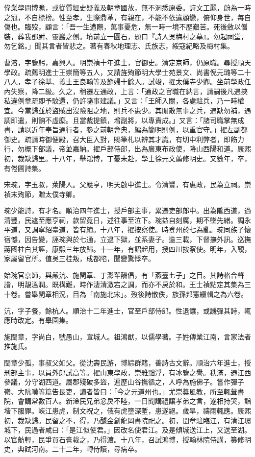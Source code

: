 \begin{pinyinscope}
偉業學問博贍，或從質經史疑義及朝章國故，無不洞悉原委。詩文工麗，蔚為一時之冠，不自標榜。性至孝，生際鼎革，有親在，不能不依違顧戀，俯仰身世，每自傷也。臨歿，顧言：「吾一生遭際，萬事憂危，無一時一境不歷艱苦。死後斂以僧裝，葬我鄧尉、靈巖之側。墳前立一圓石，題曰『詩人吳梅村之墓』。勿起祠堂，勿乞銘。」聞其言者皆悲之。著有春秋地理志、氏族志，綏寇紀略及梅村集。

曹溶，字鑒躬，嘉興人。明崇禎十年進士，官御史。清定京師，仍原職。尋授順天學政。疏薦明進士王崇簡等五人，又請旌殉節明大學士苑景文、尚書倪元璐等二十八人，孝子徐基、義士王良翰等及節婦十餘人。試竣，擢太僕寺少卿。坐前學政任內失察，降二級。久之，稍遷左通政，上言：「通政之官職在納言，請嗣後凡遇挾私違例章疏即予駮還，仍許隨事建議。」又言：「王師入關，各處駐兵，乃一時權宜。今當歸並於盜賊出沒險阻之地，則兵不患少。其閒散無事之兵，遇缺勿補，遇調即遣，則餉不虛糜。且當裁提鎮，增副將，以專責成。」又言：「諸司職掌無成書，請以近年奉旨通行者，參之前朝會典，編為簡明則例，以重官守。」擢左副都御史。疏請時御便殿，召大臣入對，賜筆札以辨其才識，有切中利弊者，即飭力行，勿概下部議，帝並嘉納。擢戶部侍郎，出為廣東布政使，降山西陽和道。康熙初，裁缺歸里。十八年，舉鴻博，丁憂未赴，學士徐元文薦修明史。又數年，卒，有倦圃詩集。

宋琬，字玉叔，萊陽人。父應亨，明天啟中進士。令清豐，有惠政，民為立祠。崇禎末殉節，贈太僕寺卿。

琬少能詩，有才名。順治四年進士，授戶部主事，累遷吏部郎中。出為隴西道，過清豐，民遮至應亨祠，款留竟日，述往事至泣下。琬益自刻厲，期不墜先緒。調永平道，又調寧紹臺道，皆有績。十八年，擢按察使。時登州於七為亂。琬同族子懷宿憾，因告變，誣琬與於七通，立逮下獄，並系妻子。逾三載，下督撫外訊。巡撫蔣國柱白其誣，康熙三年放歸。十一年，有詔起用，授四川按察使。明年，入覲，家屬留官所。值吳三桂叛，成都陷，聞變驚悸卒。

始琬官京師，與嚴沆、施閏章、丁澎輩酬倡，有「燕臺七子」之目。其詩格合聲諧，明靚溫潤。既構難，時作淒清激宕之調，而亦不戾於和。王士禎點定其集為三十卷。嘗舉閏章相況，目為「南施北宋」。歿後詩散佚，族孫邦憲綴輯之為六卷。

沆，字子餐，餘杭人。順治十二年進士，官至戶部侍郎。性退讓，或譏彈其詩，輒應時改定。有皋園集。

施閏章，字尚白，號愚山，宣城人。祖鴻猷，以儒學著。子姓傳業江南，言家法者推施氏。

閏章少孤，事叔父如父。從沈壽民游，博綜群籍，善詩古文辭。順治六年進士，授刑部主事，以員外郎試高等。擢山東學政，崇雅黜浮，有冰鑒之譽。秩滿，遷江西參議，分守湖西道。屬郡殘破多盜，遍歷山谷撫循之，人呼為施佛子。嘗作彈子嶺、大阬嘆等篇告長吏，讀者皆曰：「今之元道州也。」尤崇獎風教，所至輒葺書院，會講常數百人。新淦民兄弟忿戾不睦，一日聞講禮讓孝弟之言，遂相持哭，詣堦下服罪。峽江患虎，制文祝之，俄有虎墮深塹，患遂絕。歲旱，禱雨輒應。康熙初，裁缺歸。民留之不，得，乃醵金創龍岡書院祀之。初，閏章駐臨江，有清江環城下，民過者咸曰：「是江似使君。」因改名使君江。及是傾城送江上，又送至湖。以官舫輕，民爭買石膏載之，乃得渡。十八年，召試鴻博，授翰林院侍講，纂修明史，典試河南。二十二年，轉侍讀，尋病卒。


\end{pinyinscope}
